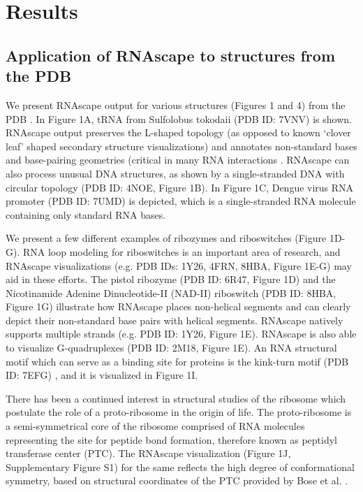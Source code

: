 \section{Results}
\subsection{Application of RNAscape to structures from the PDB}

We present RNAscape output for various structures (Figures 1 and 4) from the PDB \citep{berman2000protein}. In Figure 1A, tRNA from Sulfolobus tokodaii (PDB ID: 7VNV) is shown. RNAscape output preserves the L-shaped topology (as opposed to known ‘clover leaf’ shaped secondary structure \citep{Krahn2020} visualizations) and annotates non-standard bases and base-pairing geometries (critical in many RNA interactions \citep{Hermann1999}. RNAscape can also process unusual DNA structures, as shown by a single-stranded DNA with circular topology (PDB ID: 4NOE, Figure 1B). In Figure 1C, Dengue virus RNA promoter (PDB ID: 7UMD) is depicted, which is a single-stranded RNA molecule containing only standard RNA bases.

We present a few different examples of ribozymes and riboswitches (Figure 1D-G). RNA loop modeling \citep{Sripakdeevong2011} for riboswitches is an important area of research, and RNAscape visualizations (e.g. PDB IDs: 1Y26, 4FRN, 8HBA, Figure 1E-G) may aid in these efforts. The pistol ribozyme (PDB ID: 6R47, Figure 1D) and the Nicotinamide Adenine Dinucleotide-II (NAD-II) riboswitch (PDB ID: 8HBA, Figure 1G) illustrate how RNAscape places non-helical segments and can clearly depict their non-standard base pairs with helical segments. RNAscape natively supports multiple strands (e.g. PDB ID: 1Y26, Figure 1E). RNAscape is also able to visualize G-quadruplexes (PDB ID: 2M18, Figure 1E). An RNA structural motif which can serve as a binding site for proteins is the kink-turn motif (PDB ID: 7EFG) \citep{Schroeder2010}, and it is visualized in Figure 1I.

There has been a continued interest in structural studies of the ribosome which postulate the role of a proto-ribosome \citep{Bose2022} in the origin of life. The proto-ribosome is a semi-symmetrical core of the ribosome comprised of RNA molecules representing the site for peptide bond formation, therefore known as peptidyl transferase center (PTC). The RNAscape visualization (Figure 1J, Supplementary Figure S1) for the same reflects the high degree of conformational symmetry, based on structural coordinates of the PTC provided by Bose et al. \citep{Bose2022,}.

